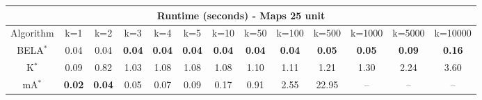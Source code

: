 \begin{tabular}{c|cccccccccccc}\toprule
\multicolumn{13}{c}{Runtime (seconds) - Maps 25 unit}\\ \midrule
Algorithm & k=1 & k=2 & k=3 & k=4 & k=5 & k=10 & k=50 & k=100 & k=500 & k=1000 & k=5000 & k=10000 \\ \midrule
BELA$^*$ & 0.04 & 0.04 & \textbf{0.04} & \textbf{0.04} & \textbf{0.04} & \textbf{0.04} & \textbf{0.04} & \textbf{0.04} & \textbf{0.05} & \textbf{0.05} & \textbf{0.09} & \textbf{0.16} \\
K$^*$ & 0.09 & 0.82 & 1.03 & 1.08 & 1.08 & 1.08 & 1.10 & 1.11 & 1.21 & 1.30 & 2.24 & 3.60 \\
mA$^*$ & \textbf{0.02} & \textbf{0.04} & 0.05 & 0.07 & 0.09 & 0.17 & 0.91 & 2.55 & 22.95 & -- & -- & -- \\ \bottomrule 
\end{tabular}
